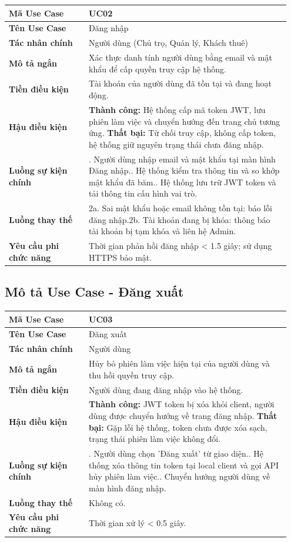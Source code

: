 \documentclass[a4paper,oneside]{report}
\begin{document}
\begin{longtable}[]{@{}>{\RaggedRight\arraybackslash}p{0.27\linewidth}>{\RaggedRight\arraybackslash}p{0.68\linewidth}@{}}
\toprule
\textbf{Mã Use Case} & UC02\tabularnewline
\midrule
\endhead
\textbf{Tên Use Case} & Đăng nhập\tabularnewline
\textbf{Tác nhân chính} & Người dùng (Chủ trọ, Quản lý, Khách
thuê)\tabularnewline
\textbf{Mô tả ngắn} & Xác thực danh tính người dùng bằng email và mật
khẩu để cấp quyền truy cập hệ thống.\tabularnewline
\textbf{Tiền điều kiện} & Tài khoản của người dùng đã tồn tại và đang
hoạt động.\tabularnewline
\textbf{Hậu điều kiện} & \textbf{Thành công:} Hệ thống cấp mã token JWT, lưu phiên làm việc và chuyển hướng đến trang chủ tương ứng.\newline 
\textbf{Thất bại:} Từ chối truy cập, không cấp token, hệ thống giữ nguyên trạng thái chưa đăng nhập.\tabularnewline
\textbf{Luồng sự kiện chính} & 1. Người dùng nhập
email và mật khẩu tại màn hình Đăng nhập.\newline 2. Hệ thống kiểm
tra thông tin và so khớp mật khẩu đã băm.\newline 3. Hệ thống lưu
trữ JWT token và tải thông tin cấu hình vai trò.\tabularnewline
\textbf{Luồng thay thế} & 2a. Sai mật khẩu hoặc email
không tồn tại: báo lỗi đăng nhập.\newline 2b. Tài khoản đang bị
khóa: thông báo tài khoản bị tạm khóa và liên hệ Admin.\tabularnewline
\textbf{Yêu cầu phi chức năng} & Thời gian phản hồi đăng nhập
\textless{} 1.5 giây; sử dụng HTTPS bảo mật.\tabularnewline
\bottomrule
\end{longtable}

\subsection{Mô tả Use Case - Đăng xuất}

\begin{longtable}[]{@{}>{\RaggedRight\arraybackslash}p{0.27\linewidth}>{\RaggedRight\arraybackslash}p{0.68\linewidth}@{}}
\toprule
\textbf{Mã Use Case} & UC03\tabularnewline
\midrule
\endhead
\textbf{Tên Use Case} & Đăng xuất\tabularnewline
\textbf{Tác nhân chính} & Người dùng\tabularnewline
\textbf{Mô tả ngắn} & Hủy bỏ phiên làm việc hiện tại của người dùng và
thu hồi quyền truy cập.\tabularnewline
\textbf{Tiền điều kiện} & Người dùng đang đăng nhập vào hệ
thống.\tabularnewline
\textbf{Hậu điều kiện} & \textbf{Thành công:} JWT token bị xóa khỏi client, người dùng được chuyển hướng về trang đăng nhập.\newline 
\textbf{Thất bại:} Gặp lỗi hệ thống, token chưa được xóa sạch, trạng thái phiên làm việc không đổi.\tabularnewline
\textbf{Luồng sự kiện chính} & 1. Người dùng chọn
'Đăng xuất' từ giao diện.\newline 2. Hệ thống xóa thông tin token
tại local client và gọi API hủy phiên làm việc.\newline 3. Chuyển
hướng người dùng về màn hình đăng nhập.\tabularnewline
\textbf{Luồng thay thế} & Không có.\tabularnewline
\textbf{Yêu cầu phi chức năng} & Thời gian xử lý \textless{} 0.5
giây.\tabularnewline
\bottomrule
\end{longtable}
\end{document}
